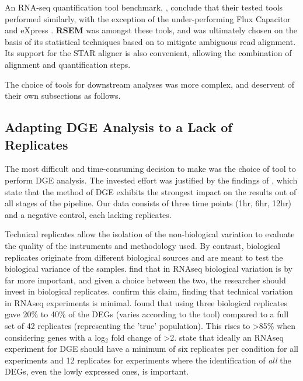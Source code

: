 An RNA-seq quantification tool benchmark, \cite{teng2016benchmark}, conclude that their tested tools performed similarly, with the exception of the under-performing Flux Capacitor \citep{} and eXpress \citep{}. \textbf{RSEM} was amongst these tools, and was ultimately chosen on the basis of its statistical techniques based on \cite{li2010rna} to mitigate ambiguous read alignment. Its support for the STAR aligner is also convenient, allowing the combination of alignment and quantification steps. 

The choice of tools for downstream analyses was more complex, and deservent of their own subsections as follows.


\subsection{Adapting DGE Analysis to a Lack of Replicates}
\label{DGE no replicates}

The most difficult and time-consuming decision to make was the choice of tool to perform \ac{DGE} analysis. The invested effort was justified by the findings of \cite{williams2017empirical}, which state that the method of \ac{DGE} exhibits the strongest impact on the results out of all stages of the pipeline. Our data consists of three time points (1hr, 6hr, 12hr) and a negative control, each lacking replicates. 

Technical replicates allow the isolation of the non-biological variation to evaluate the quality of the instruments and methodology used. By contrast, biological replicates originate from different biological sources and are meant to test the biological variance of the samples. \cite{liu2014rna} find that in RNAseq biological variation is by far more important, and given a choice between the two, the researcher should invest in biological replicates. \cite{bullard2010evaluation} confirm this claim, finding that technical variation in RNAseq experiments is minimal. \cite{schurch2016many} found that using three biological replicates gave 20\% to 40\% of the \ac{DEG}s (varies according to the tool) compared to a full set of 42 replicates (representing the 'true' population). This rises to >85\% when considering genes with a log$_2$ fold change of >2. \cite{schurch2016many} state that ideally an RNAseq experiment for \ac{DGE} should have a minimum of six replicates per condition for all experiments and 12 replicates for experiments where the identification of \textit{all} the \ac{DEG}s, even the lowly expressed ones, is important. 

